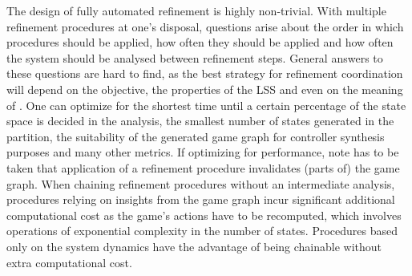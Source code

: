 The design of fully automated refinement is highly non-trivial.
With multiple refinement procedures at one's disposal, questions arise about the order in which procedures should be applied, how often they should be applied and how often the system should be analysed between refinement steps.
General answers to these questions are hard to find, as the best strategy for refinement coordination will depend on the objective, the properties of the LSS and even on the meaning of .
One can optimize for the shortest time until a certain percentage of the state space is decided in the analysis, the smallest number of states generated in the partition, the suitability of the generated game graph for controller synthesis purposes and many other metrics.
If optimizing for performance, note has to be taken that application of a refinement procedure invalidates (parts of) the game graph.
When chaining refinement procedures without an intermediate analysis, procedures relying on insights from the game graph incur significant additional computational cost as the game's actions have to be recomputed, which involves operations of exponential complexity in the number of states.
Procedures based only on the system dynamics have the advantage of being chainable without extra computational cost.

